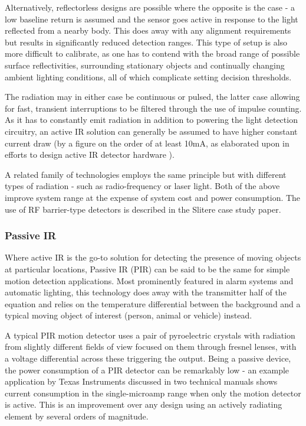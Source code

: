 \documentclass[10pt,nocopyrightspace]{ewsn-proc}
\begin{document}
Alternatively, reflectorless designs are possible where the opposite is the case - a low baseline return is assumed and the sensor goes active in response to the light reflected from a nearby body. This does away with any alignment requirements but results in significantly reduced detection ranges. This type of setup is also more difficult to calibrate, as one has to contend with the broad range of possible surface reflectivities, surrounding stationary objects and continually changing ambient lighting conditions, all of which complicate setting decision thresholds.

The radiation may in either case be continuous or pulsed, the latter case allowing for fast, transient interruptions to be filtered through the use of impulse counting. As it has to constantly emit radiation in addition to powering the light detection circuitry, an active IR solution can generally be assumed to have higher constant current draw (by a figure on the order of at least 10mA, as elaborated upon in efforts to design active IR detector hardware \cite{ActiveIR}).


A related family of technologies employs the same principle but with different types of radiation - such as radio-frequency or laser light. Both of the above improve system range at the expense of system cost and power consumption. The use of RF barrier-type detectors is described in the Slitere case study paper\cite{Slitere}.

\subsubsection{Passive IR}
Where active IR is the go-to solution for detecting the presence of moving objects at particular locations, Passive IR (PIR) can be said to be the same for simple motion detection applications. Most prominently featured in alarm systems and automatic lighting, this technology does away with the transmitter half of the equation and relies on the temperature differential between the background and a typical moving object of interest (person, animal or vehicle) instead.

A typical PIR motion detector uses a pair of pyroelectric crystals with radiation from slightly different fields of view focused on them through fresnel lenses, with a voltage differential across these triggering the output. Being a passive device, the power consumption of a PIR detector can be remarkably low - an example application by Texas Instruments discussed in two technical manuals\cite{TI:PIR}\cite{TI:APP} shows current consumption in the single-microamp range when only the motion detector is active. This is an improvement over any design using an actively radiating element by several orders of magnitude.
\end{document}
